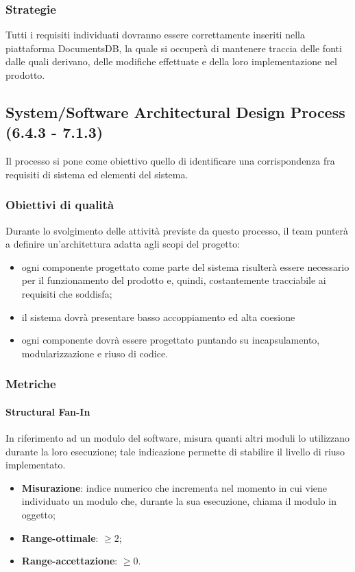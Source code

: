 \subsubsection{Strategie}
Tutti i requisiti individuati dovranno essere correttamente inseriti nella piattaforma DocumentsDB, la quale si occuperà di mantenere traccia delle fonti dalle quali derivano, delle modifiche effettuate e della loro implementazione nel prodotto.
\subsection{System/Software Architectural Design Process (6.4.3 - 7.1.3)}
\label{sySoArchiDesign}
Il processo si pone come obiettivo quello di identificare una corrispondenza fra requisiti di sistema ed elementi del sistema.
\subsubsection{Obiettivi di qualità}
Durante lo svolgimento delle attività previste da questo processo, il team punterà a definire un'architettura adatta agli scopi del progetto:
\begin{itemize}
\item ogni componente progettato come parte del sistema risulterà essere necessario per il funzionamento del prodotto e, quindi, costantemente tracciabile ai requisiti che soddisfa;
\item il sistema dovrà presentare basso accoppiamento ed alta coesione
\item ogni componente dovrà essere progettato puntando su incapsulamento, modularizzazione e riuso di codice.
\end{itemize}
\subsubsection{Metriche}
\paragraph{Structural Fan-In}
In riferimento ad un modulo del software, misura quanti altri moduli lo utilizzano durante la loro esecuzione; tale indicazione permette di stabilire il livello di riuso implementato.
\begin{itemize}
\item \textbf{Misurazione}: indice numerico che incrementa nel momento in cui viene individuato un modulo che, durante la sua esecuzione, chiama il modulo in oggetto;
\item \textbf{Range-ottimale}: $\geq 2$;
\item \textbf{Range-accettazione}: $\geq 0$.
\end{itemize}
